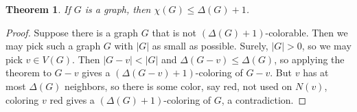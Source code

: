 \documentclass[openany]{tufte-book} %
\theoremstyle{plain}
\newtheorem{theorem}{Theorem}
\newcommand{\card}[1]{\left|#1\right|}
\newcommand{\parens}[1]{\left( #1 \right)}
\begin{document}
\begin{theorem}\label{SecondWorstUpperBound}
If $G$ is a graph, then $\chi(G) \le \Delta(G) + 1$.
\end{theorem}
\begin{proof}
Suppose there is a graph $G$ that is not $\parens{\Delta(G) + 1}$-colorable.  Then we may pick such a graph $G$ with $\card{G}$ as small as possible.
Surely, $\card{G} > 0$, so we may pick $v \in V(G)$.  Then $\card{G-v} < \card{G}$ and $\Delta(G-v) \le \Delta(G)$, so applying the theorem to $G-v$ gives a $\parens{\Delta(G-v) + 1}$-coloring
of $G-v$.  But $v$ has at most $\Delta(G)$ neighbors, so there is some color, say red, not used on $N(v)$, coloring $v$ red gives a $\parens{\Delta(G) + 1}$-coloring
of $G$, a contradiction.
\end{proof}
\end{document}
